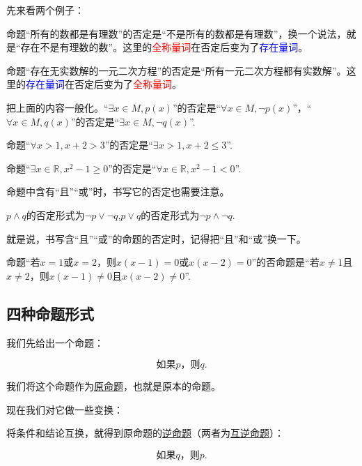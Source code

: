 \documentclass[lang=cn,math=cm,chinesefont=nofont,11pt,scheme=chinese,onecol]{elegantbook}
\begin{document}
先来看两个例子：

命题“所有的数都是有理数”的否定是“不是所有的数都是有理数”，换一个说法，就是“存在不是有理数的数”。这里的\textcolor{red}{全称量词}在否定后变为了\textcolor{blue}{存在量词}。

命题“存在无实数解的一元二次方程”的否定是“所有一元二次方程都有实数解”。这里的\textcolor{blue}{存在量词}在否定后变为了\textcolor{red}{全称量词}。

把上面的内容一般化。“$\exists x\in M, p(x)$”的否定是“$\forall x{\in}M,\neg p(x)$”，“$\forall x\in M, q(x)$”的否定是“$\exists x{\in}M, \neg q(x)$”.

\begin{example}
  命题“$\forall x>1,x+2>3$”的否定是“$\exists x>1,x+2\leqslant 3$”.
\end{example}

\begin{example}
  命题“$\exists x\in\mathbb{R},x^2-1\geqslant 0$”的否定是“$\forall x\in\mathbb{R},x^2-1<0$”.
\end{example}

命题中含有“且”“或”时，书写它的否定也需要注意。

$p\land q$的否定形式为$\lnot p\lor \lnot q$,$p\lor q$的否定形式为$\lnot p\land \lnot q$.

就是说，书写含“且”“或”的命题的否定时，记得把“且”和“或”换一下。

\begin{example}
  命题“若$x=1$或$x=2$，则$x(x-1)=0$或$x(x-2)=0$”的否命题是“若$x\neq 1$且$x\neq 2$，则$x(x-1)\neq 0$且$x(x-2)\neq 0$”.
\end{example}

\subsection{四种命题形式}

我们先给出一个命题：

\begin{equation}\label{YuanMingTi}
  \text{如果}p\text{，则}q.
\end{equation}

我们将这个命题作为\underline{原命题}，也就是原本的命题。

现在我们对它做一些变换：

将条件和结论互换，就得到原命题的\underline{逆命题}（两者为\underline{互逆命题}）：

\begin{equation}\label{NiMingTi}
  \text{如果}q\text{，则}p.
\end{equation}
\end{document}
